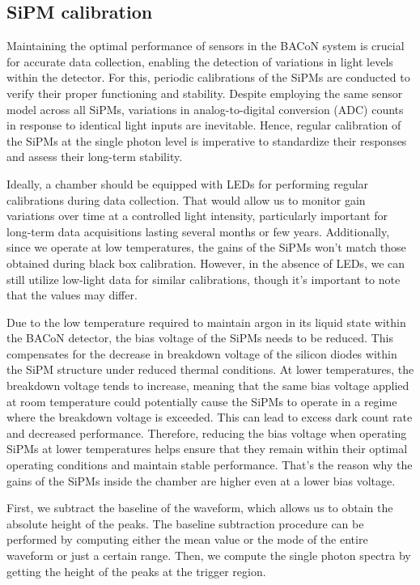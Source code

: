 \documentclass[11pt,a4paper,english,oneside, pdf]{article}
\begin{document}
	\subsection{SiPM calibration}
	\label{calibration_sec}
	
	Maintaining the optimal performance of sensors in the BACoN system is crucial for accurate data collection, enabling the detection of variations in light levels within the detector. For this, periodic calibrations of the SiPMs are conducted to verify their proper functioning and stability. Despite employing the same sensor model across all SiPMs, variations in analog-to-digital conversion (ADC) counts in response to identical light inputs are inevitable. Hence, regular calibration of the SiPMs at the single photon level is imperative to standardize their responses and assess their long-term stability.
	
	Ideally, a chamber should be equipped with LEDs for performing regular calibrations during data collection. That would allow us to monitor gain variations over time at a controlled light intensity, particularly important for long-term data acquisitions lasting several months or few years. Additionally, since we operate at low temperatures, the gains of the SiPMs won't match those obtained during black box calibration. However, in the absence of LEDs, we can still utilize low-light data for similar calibrations, though it's important to note that the values may differ.
	
	Due to the low temperature required to maintain argon in its liquid state within the BACoN detector, the bias voltage of the SiPMs needs to be reduced. This compensates for the decrease in breakdown voltage of the silicon diodes within the SiPM structure under reduced thermal conditions. At lower temperatures, the breakdown voltage tends to increase, meaning that the same bias voltage applied at room temperature could potentially cause the SiPMs to operate in a regime where the breakdown voltage is exceeded. This can lead to excess dark count rate and decreased performance. Therefore, reducing the bias voltage when operating SiPMs at lower temperatures helps ensure that they remain within their optimal operating conditions and maintain stable performance. That's the reason why the gains of the SiPMs inside the chamber are higher even at a lower bias voltage.
	
	
	First, we subtract the baseline of the waveform, which allows us to obtain the absolute height of the peaks. The baseline subtraction procedure can be performed by computing either the mean value or the mode of the entire waveform or just a certain range. 
	Then, we compute the single photon spectra by getting the height of the peaks at the trigger region. 
	
\end{document}
